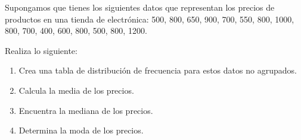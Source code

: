 \begin{exercise}
    Supongamos que tienes los siguientes datos que representan los precios de productos en una tienda de electrónica:
    500, 800, 650, 900, 700, 550, 800, 1000, 800, 700, 400, 600, 800, 500, 800, 1200.

    Realiza lo siguiente:
    \begin{enumerate}
        \item Crea una tabla de distribución de frecuencia para estos datos no agrupados.
        \item Calcula la media de los precios.
        \item Encuentra la mediana de los precios.
        \item Determina la moda de los precios.
    \end{enumerate}
\end{exercise}
